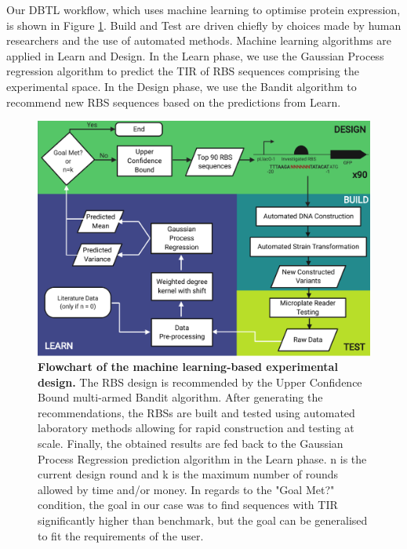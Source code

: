 \documentclass{article}
\begin{document}
Our DBTL workflow, which uses machine learning to optimise protein expression, is shown in Figure \ref{fig: Flowchart}.
Build and Test are driven chiefly by choices made by human researchers and the use of automated methods.
Machine learning algorithms are applied in Learn and Design.
In the Learn phase, we use the Gaussian Process regression algorithm to predict the TIR of RBS sequences comprising the experimental space.
In the Design phase, we use the Bandit algorithm to recommend new RBS sequences based on the predictions from Learn.\\

\begin{figure}[h]
    \centering
    \includegraphics[scale=0.7]{plots/Main_Paper/flowchart.pdf}
    \caption{\textbf{Flowchart of the machine learning-based experimental design.} The RBS design is recommended by the Upper Confidence Bound multi-armed Bandit algorithm. After generating the recommendations, the RBSs are built and tested using automated laboratory methods allowing for rapid construction and testing at scale. Finally, the obtained results are fed back to the Gaussian Process Regression prediction algorithm in the Learn phase. n is the current design round and k is the maximum number of rounds allowed by time and/or money. In regards to the "Goal Met?" condition, the goal in our case was to find sequences with TIR significantly higher than benchmark, but the goal can be generalised to fit the requirements of the user.} 
    \label{fig: Flowchart}
\end{figure}
\end{document}
